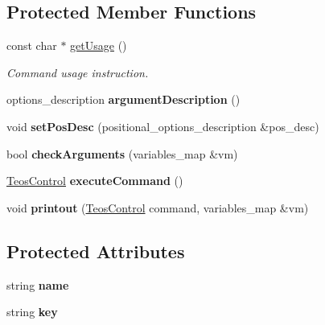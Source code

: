 \subsection*{Protected Member Functions}
\begin{DoxyCompactItemize}
\item 
const char $\ast$ \mbox{\hyperlink{classteos_1_1command_1_1_wallet_import_options_ad641b37bd61f2d4ff3e3049e2dd6be0e}{get\+Usage}} ()
\begin{DoxyCompactList}\small\item\em Command \textquotesingle{}usage\textquotesingle{} instruction. \end{DoxyCompactList}\item 
\mbox{\label{classteos_1_1command_1_1_wallet_import_options_a5b23093e1d0189769adcbd8f9bbd8d3a}} 
options\+\_\+description {\bfseries argument\+Description} ()
\item 
\mbox{\label{classteos_1_1command_1_1_wallet_import_options_a33c430a28ea488b0736bb9a09a7f3908}} 
void {\bfseries set\+Pos\+Desc} (positional\+\_\+options\+\_\+description \&pos\+\_\+desc)
\item 
\mbox{\label{classteos_1_1command_1_1_wallet_import_options_a0b788a2c585f9c9df79c4be401bd8ebb}} 
bool {\bfseries check\+Arguments} (variables\+\_\+map \&vm)
\item 
\mbox{\label{classteos_1_1command_1_1_wallet_import_options_ac0ecd44469164674a49462711d213532}} 
\mbox{\hyperlink{classteos_1_1_teos_control}{Teos\+Control}} {\bfseries execute\+Command} ()
\item 
\mbox{\label{classteos_1_1command_1_1_wallet_import_options_a45ecbc443e738c6da3e8d7416cfa4468}} 
void {\bfseries printout} (\mbox{\hyperlink{classteos_1_1_teos_control}{Teos\+Control}} command, variables\+\_\+map \&vm)
\end{DoxyCompactItemize}
\subsection*{Protected Attributes}
\begin{DoxyCompactItemize}
\item 
\mbox{\label{classteos_1_1command_1_1_wallet_import_options_af3d4f31c9434cbae7325ac094cbefa30}} 
string {\bfseries name}
\item 
\mbox{\label{classteos_1_1command_1_1_wallet_import_options_af81e0809fede96b8d0b627d141e80cc3}} 
string {\bfseries key}
\end{DoxyCompactItemize}
